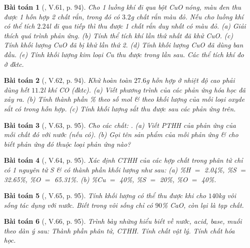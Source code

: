 \documentclass{article}
\newtheorem{baitoan}{Bài toán}
\begin{document}
\begin{baitoan}[\cite{Truong_BTNC_Hoa_Hoc_8_2022}, V.61, p. 94]
	Cho 1 luồng khí \emph{} đi qua bột \emph{CuO} nóng, màu đen thu được 1 hỗn hợp 2 chất rắn, trong đó có $3.2$\emph{g} chất rắn màu đỏ. Nếu cho luồng khí \emph{} có thể tích $2.24$\emph{l} đi qua tiếp thì thu được 1 chất rắn duy nhất có màu đỏ. (a) Giải thích quá trình phản ứng. (b) Tính thể tích khí \emph{} lần thứ nhất đã khử \emph{CuO}. (c) Tính khối lượng \emph{CuO} đã bị khử lần thứ 2. (d) Tính khối lượng \emph{CuO} đã dùng ban đầu. (e) Tính khối lượng kim loại \emph{Cu} thu được trong lần sau. Các thể tích khí đo ở đktc.
\end{baitoan}

\begin{baitoan}[\cite{Truong_BTNC_Hoa_Hoc_8_2022}, V.62, p. 94]
	Khử hoàn toàn $27.6$\emph{g} hỗn hợp \emph{} ở nhiệt độ cao phải dùng hết $11.2$\emph{l} khí \emph{CO} (đktc). (a) Viết phương trình của các phản ứng hóa học đã xảy ra. (b) Tính thành phần \% theo số mol \& theo khối lượng của mỗi loại oxyde sắt có trong hỗn hợp. (c) Tính khối lượng sắt thu được sau các phản ứng trên.
\end{baitoan}

\begin{baitoan}[\cite{Truong_BTNC_Hoa_Hoc_8_2022}, V.63, p. 95]
	Cho các chất: \emph{}. (a) Viết PTHH của phản ứng của mỗi chất đó với nước (nếu có). (b) Gọi tên sản phẩm của mỗi phản ứng \& cho biết phản ứng đó thuộc loại phản ứng nào?
\end{baitoan}

\begin{baitoan}[\cite{Truong_BTNC_Hoa_Hoc_8_2022}, V.64, p. 95]
	Xác định CTHH của các hợp chất trong phân tử chỉ có 1 nguyên tử \emph{S} \& có thành phần khối lượng như sau: (a) \emph{\%H $=$ 2.04\%, \%S $=$ 32.65\%, \%O $=$ 65.31\%}. (b) \emph{\%Cu $=$ 40\%, \%S $=$ 20\%, \%O $=$ 40\%}.
\end{baitoan}

\begin{baitoan}[\cite{Truong_BTNC_Hoa_Hoc_8_2022}, V.65, p. 95]
	Tính khối lượng \emph{} có thể thu được khi cho $140$\emph{kg} vôi sống tác dụng với nước. Biết trong vôi sống chỉ có $90$\% \emph{CaO}, còn lại là tạp chất.
\end{baitoan}

\begin{baitoan}[\cite{Truong_BTNC_Hoa_Hoc_8_2022}, V.66, p. 95]
	Trình bày những hiểu biết về nước, acid, base, muối theo dàn ý sau: Thành phần phân tử, CTHH. Tính chất vật lý. Tính chất hóa học.
\end{baitoan}
\end{document}
